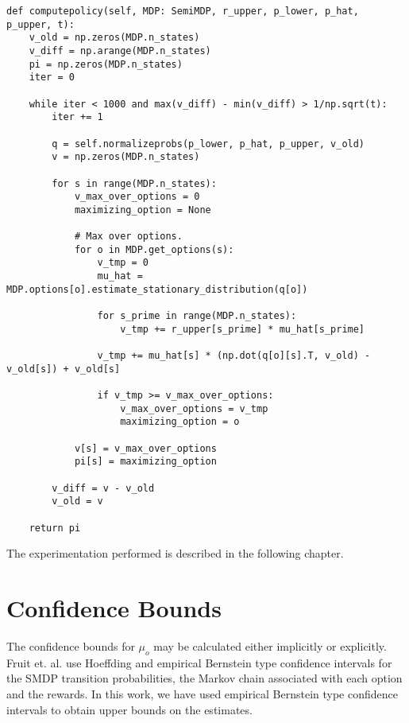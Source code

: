 \begin{verbatim}
def computepolicy(self, MDP: SemiMDP, r_upper, p_lower, p_hat, p_upper, t):
    v_old = np.zeros(MDP.n_states)
    v_diff = np.arange(MDP.n_states)
    pi = np.zeros(MDP.n_states)
    iter = 0

    while iter < 1000 and max(v_diff) - min(v_diff) > 1/np.sqrt(t):
        iter += 1

        q = self.normalizeprobs(p_lower, p_hat, p_upper, v_old)
        v = np.zeros(MDP.n_states)

        for s in range(MDP.n_states):
            v_max_over_options = 0
            maximizing_option = None

            # Max over options.
            for o in MDP.get_options(s):
                v_tmp = 0
                mu_hat = MDP.options[o].estimate_stationary_distribution(q[o])

                for s_prime in range(MDP.n_states):
                    v_tmp += r_upper[s_prime] * mu_hat[s_prime]

                v_tmp += mu_hat[s] * (np.dot(q[o][s].T, v_old) - v_old[s]) + v_old[s]

                if v_tmp >= v_max_over_options:
                    v_max_over_options = v_tmp
                    maximizing_option = o

            v[s] = v_max_over_options
            pi[s] = maximizing_option

        v_diff = v - v_old
        v_old = v

    return pi
\end{verbatim}

The experimentation performed is described in the following chapter. 

\section{Confidence Bounds}

The confidence bounds for $\mu_o$ may be calculated either implicitly or explicitly.
Fruit et. al. \cite{fruit_regret_2017} use Hoeffding and empirical Bernstein type confidence intervals for the SMDP transition probabilities, the Markov chain associated with each option and the rewards.
In this work, we have used empirical Bernstein type confidence intervals to obtain upper bounds on the estimates.


